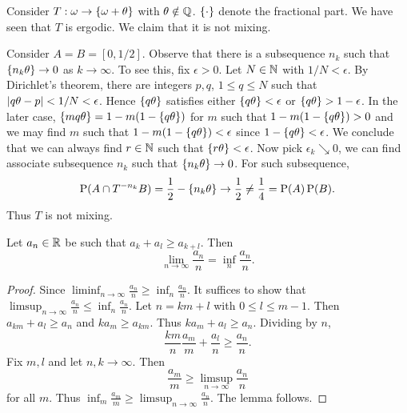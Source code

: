 \begin{remark}
    Consider $T:\omega\to\left\{ {\omega+\theta} \right\}$ with $\theta\notin\mathbb{Q}$. 
    $\left\{ {\cdot} \right\}$ denote the fractional part. We have seen that $T$ 
    is ergodic. We claim that it is not mixing. 

    Consider $A = B = [0,1/2]$. Observe that there is a subsequence $n_k$ such 
    that $\left\{ {n_k\theta} \right\}\to 0$ as $k\to\infty$. To see this, fix $\epsilon>0$. 
    Let $N\in\mathbb{N}$ with $1/N<\epsilon$. By Dirichlet's theorem, there are integers 
    $p,q$, $1\leq q\leq N$ such that $\left\lvert {q\theta - p} \right\rvert<1/N<\epsilon$. Hence 
    $\left\{ {q\theta} \right\}$ satisfies either $\left\{ {q\theta} \right\}<\epsilon$ or $\left\{ {q\theta} \right\}>1-\epsilon$. 
    In the later case, $\left\{ {mq\theta} \right\} = 1-m(1-\left\{ {q\theta} \right\})$ for $m$ such that 
    $1-m(1-\left\{ {q\theta} \right\})>0$ and we may find $m$ such that $1-m(1-\left\{ {q\theta} \right\})<\epsilon$ 
    since $1-\left\{ {q\theta} \right\}<\epsilon$. We conclude that we can always find $r\in\mathbb{N}$ 
    such that $\left\{ {r\theta} \right\}<\epsilon$. Now pick $\epsilon_k\searrow 0$, we can find 
    associate subsequence $n_k$ such that $\left\{ {n_k\theta} \right\}\to 0$. For such subsequence, 
    \begin{equation*}
        \operatorname{P}(A\cap T^{-n_k}B) = \frac{1}{2}-\left\{ {n_k\theta} \right\}\to \frac{1}{2}\neq \frac{1}{4} = \operatorname{P}(A)\operatorname{P}(B). 
    \end{equation*}
    Thus $T$ is not mixing. 
\end{remark}

\begin{lemma}[Fekete]
    Let $a_n\in\mathbb{R}$ be such that $a_k+a_l\geq a_{k+l}$. Then 
    \begin{equation*}
        \lim_{n\to\infty} \frac{a_n}{n} = \inf_{n}\frac{a_n}{n}. 
    \end{equation*}
\end{lemma}
\begin{proof}
    Since $\liminf_{n\to\infty}\frac{a_n}{n}\geq \inf_{n}\frac{a_n}{n}$. 
    It suffices to show that $\limsup_{n\to\infty}\frac{a_n}{n}\leq 
    \inf_{n}\frac{a_n}{n}$. Let $n = km+l$ with $0\leq l\leq m-1$. 
    Then $a_{km}+a_l\geq a_n$ and $ka_m\geq a_{km}$. Thus $ka_m + a_l\geq a_n$. 
    Dividing by $n$, 
    \begin{equation*}
        \frac{km}{n}\frac{a_m}{m} + \frac{a_l}{n}\geq \frac{a_n}{n}. 
    \end{equation*} 
    Fix $m,l$ and let $n,k\to\infty$. Then 
    \begin{equation*}
        \frac{a_m}{m}\geq \limsup_{n\to\infty}\frac{a_n}{n}
    \end{equation*}
    for all $m$. Thus $\inf_{m}\frac{a_m}{m}\geq \limsup_{n\to\infty}\frac{a_n}{n}$. 
    The lemma follows. 
\end{proof}


